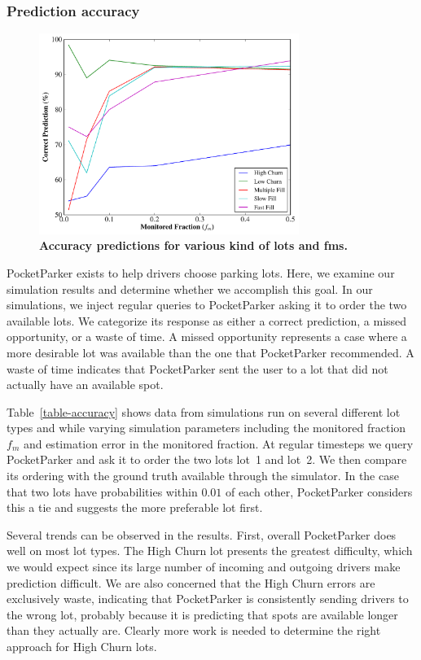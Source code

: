 \subsubsection{Prediction accuracy}



\begin{figure}[t]
\centering
\includegraphics[width=3.325in]{./simulator/figures/accuracy_graph.pdf}

\caption{\textbf{Accuracy predictions for various kind of lots and fms.} }
\label{fig-accuracy}
\end{figure}

PocketParker exists to help drivers choose parking lots. Here, we examine our
simulation results and determine whether we accomplish this goal. In our
simulations, we inject regular queries to PocketParker asking it to order the
two available lots. We categorize its response as either a correct
prediction, a missed opportunity, or a waste of time. A missed opportunity
represents a case where a more desirable lot was available than the one that
PocketParker recommended. A waste of time indicates that PocketParker sent
the user to a lot that did not actually have an available spot.

Table~\ref{table-accuracy} shows data from simulations run on several
different lot types and while varying simulation parameters including the
monitored fraction $f_m$ and estimation error in the monitored fraction. At
regular timesteps we query PocketParker and ask it to order the two lots
lot~1 and lot~2. We then compare its ordering with the ground truth available
through the simulator. In the case that two lots have probabilities within
$0.01$ of each other, PocketParker considers this a tie and suggests the more
preferable lot first.

Several trends can be observed in the results. First, overall PocketParker
does well on most lot types. The High Churn lot presents the greatest
difficulty, which we would expect since its large number of incoming and
outgoing drivers make prediction difficult. We are also concerned that the
High Churn errors are exclusively waste, indicating that PocketParker is
consistently sending drivers to the wrong lot, probably because it is
predicting that spots are available longer than they actually are. Clearly
more work is needed to determine the right approach for High Churn lots.

